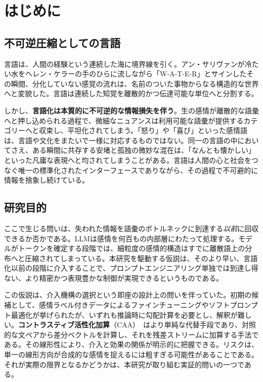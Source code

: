 \chapter{はじめに}
\label{chap:introduction}

\section{不可逆圧縮としての言語}
言語は、人間の経験という連続した海に境界線を引く。アン・サリヴァンが冷たい水をヘレン・ケラーの手のひらに流しながら「W-A-T-E-R」とサインしたその瞬間、分化していない感覚の流れは、名前のついた事物からなる構造的な世界へと変貌した。言語は連続した知覚を離散的かつ伝達可能な単位へと分割する。

しかし、\textbf{言語化は本質的に不可逆的な情報損失を伴う}。生の感情が離散的な語彙へと押し込められる過程で、微細なニュアンスは利用可能な語彙が提供するカテゴリーへと収束し、平坦化されてしまう。「怒り」や「喜び」といった感情語は、言語や文化をまたいで一様に対応するものではない\cite{jackson2019emotion}。同一の言語の中においてさえ、ある瞬間に共存する安堵と孤独の微妙な混在は、「なんとも懐かしい」といった凡庸な表現へと均されてしまうことがある。言語は人間の心と社会をつなぐ唯一の標準化されたインターフェースでありながら、その過程で不可避的に情報を捨象し続けている。


\section{研究目的}

ここで生じる問いは、失われた情報を語彙のボトルネックに到達する\emph{以前}に回収できるか否かである。LLMは感情を何百もの内部層にわたって処理する。モデルがトークンを確定する段階では、細粒度の感情的構造はすでに離散語上の分布へと圧縮されてしまっている。本研究を駆動する仮説は、そのより早い、言語化以前の段階に介入することで、プロンプトエンジニアリング単独では到達し得ない、より精密かつ表現豊かな制御が実現できるというものである。

この仮説は、介入機構の選択という即座の設計上の問いを伴っていた。初期の候補として、感情ラベル付きデータによるファインチューニングやソフトプロンプト最適化が挙げられたが、いずれも推論時に勾配計算を必要とし、解釈が難しい。\textbf{コントラスティブ活性化加算}（CAA）~\cite{caa}はより単純な代替手段であり、対照的な文ペアから差分ベクトルを計算し、それを残差ストリームに加算する手法である。その線形性により、介入と効果の関係が明示的に把握できる。リスクは、単一の線形方向が合成的な感情を捉えるには粗すぎる可能性があることである。それが実際の限界となるかどうかは、本研究が取り組む実証的問いの一つである。

